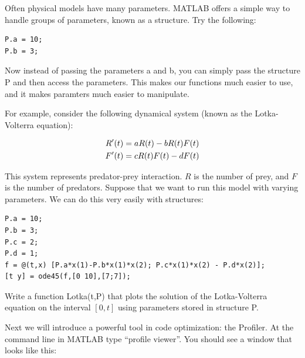 

Often physical models have many parameters. MATLAB offers a simple way to handle groups of parameters, known as a structure. Try the following:

\begin{verbatim}
P.a = 10;
P.b = 3;
\end{verbatim}

Now instead of passing the parameters a and b, you can simply pass the structure P and then access the parameters. This makes our functions much easier to use, and it makes paramters much easier to manipulate.

For example, consider the following dynamical system (known as the Lotka-Volterra equation):

\begin{equation}
    \begin{split}
        R'(t) &=aR(t)-bR(t)F(t)\\
        F'(t) &=cR(t)F(t)-dF(t)
    \end{split}\notag
\end{equation}

This system represents predator-prey interaction. $R$ is the number of prey, and $F$ is the number of predators. Suppose that we want to run this model with varying parameters. We can do this very easily with structures:

\begin{verbatim}
P.a = 10;
P.b = 3;
P.c = 2;
P.d = 1;
f = @(t,x) [P.a*x(1)-P.b*x(1)*x(2); P.c*x(1)*x(2) - P.d*x(2)];
[t y] = ode45(f,[0 10],[7;7]);
\end{verbatim}

\begin{problem}
Write a function Lotka(t,P) that plots the solution of the Lotka-Volterra equation on the interval $[0,t]$ using parameters stored in structure P. 
\end{problem}

Next we will introduce a powerful tool in code optimization: the Profiler. At the command line in MATLAB type ``profile viewer''. You should see a window that looks like this:

